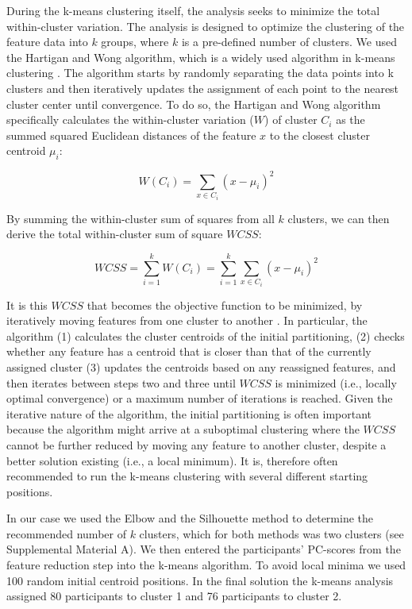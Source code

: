 During the k-means clustering itself, the analysis seeks to minimize the
total within-cluster variation. The analysis is designed to optimize the
clustering of the feature data into \(k\) groups, where \(k\) is a
pre-defined number of clusters. We used the Hartigan and Wong algorithm,
which is a widely used algorithm in k-means clustering
\citep{hartigan1979}. The algorithm starts by randomly separating the
data points into k clusters and then iteratively updates the assignment
of each point to the nearest cluster center until convergence. To do so,
the Hartigan and Wong algorithm specifically calculates the
within-cluster variation (\(W\)) of cluster \(C_i\) as the summed
squared Euclidean distances of the feature \(x\) to the closest cluster
centroid \(\mu_i\):

\begin{equation} \label{eq:kWCi}
  W(C_i) = \sum_{x \in C_i}(x-\mu_i)^2
\end{equation}

By summing the within-cluster sum of squares from all \(k\) clusters, we
can then derive the total within-cluster sum of square \(WCSS\):

\begin{equation} \label{eq:kWCSS}
  WCSS = \sum_{i=1}^k W(C_i) = \sum_{i=1}^k \sum_{x \in C_i} (x - \mu_i)^2
\end{equation}

It is this \(WCSS\) that becomes the objective function to be minimized,
by iteratively moving features from one cluster to another
\citep{hartigan1979}. In particular, the algorithm (1) calculates the
cluster centroids of the initial partitioning, (2) checks whether any
feature has a centroid that is closer than that of the currently
assigned cluster (3) updates the centroids based on any reassigned
features, and then iterates between steps two and three until \(WCSS\)
is minimized (i.e., locally optimal convergence) or a maximum number of
iterations is reached. Given the iterative nature of the algorithm, the
initial partitioning is often important because the algorithm might
arrive at a suboptimal clustering where the \(WCSS\) cannot be further
reduced by moving any feature to another cluster, despite a better
solution existing (i.e., a local minimum). It is, therefore often
recommended to run the k-means clustering with several different
starting positions.

In our case we used the Elbow and the Silhouette method to determine the
recommended number of \(k\) clusters, which for both methods was two
clusters (see Supplemental Material A). We then entered the
participants' PC-scores from the feature reduction step into the k-means
algorithm. To avoid local minima we used 100 random initial centroid
positions. In the final solution the k-means analysis assigned 80
participants to cluster 1 and 76 participants to cluster 2.
